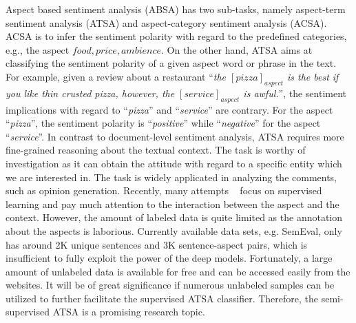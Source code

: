 \documentclass[11pt,a4paper]{article}
\begin{document}
Aspect based sentiment analysis (ABSA) has two sub-tasks, namely aspect-term sentiment analysis (ATSA) and aspect-category sentiment analysis (ACSA). ACSA is to infer the sentiment polarity with regard to the predefined categories, e.g., the aspect $food, price, ambience$. On the other hand, ATSA aims at classifying the sentiment polarity of a given aspect word or phrase in the text. 
For example, given a review about a restaurant ``\emph{the $[pizza]_{aspect}$ is the best if you like thin crusted pizza, however, the $[service]_{aspect}$ is awful.}'', the sentiment implications with regard to ``\emph{pizza}'' and ``\emph{service}'' are contrary.
For the aspect ``\emph{pizza}'', the sentiment polarity is ``\emph{positive}'' while ``\emph{negative}'' for the aspect ``\emph{service}''.
In contrast to document-level sentiment analysis, ATSA requires more fine-grained reasoning about the textual context.
The task is worthy of investigation as it can obtain the attitude with regard to a specific entity which we are interested in. The task is widely applicated in analyzing the comments, such as opinion generation.
Recently, many attempts ~\cite{DBLP:conf/emnlp/TangQL16,DBLP:conf/acl/PanW18,DBLP:conf/naacl/LiuCB18,xue2018aspect,li2018hierarchical} focus on supervised learning and pay much attention to the interaction between the aspect and the context. However, the amount of labeled data is quite limited as the annotation about the aspects is laborious.
Currently available data sets, e.g. SemEval, only has around 2K unique sentences and 3K sentence-aspect pairs, which is insufficient to fully exploit the power of the deep models. Fortunately, a large amount of unlabeled data is available for free and can be accessed easily from the websites.
It will be of great significance if numerous unlabeled samples can be utilized to further facilitate the supervised ATSA classifier.
Therefore, the semi-supervised ATSA is a promising research topic.
\end{document}
